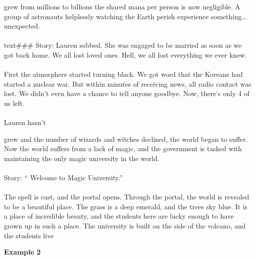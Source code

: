 \begin{tcolorbox}[
    base style,
    colback=boxcolor,
    coltitle=white,
    colbacktitle=headercolor,
    title=Standard Generation
]
{\color{red}grew from millions to billions the shared mana per person is now negligible. A group of astronauts helplessly watching the Earth perish experience something... unexpected.
\\
\\
text{\#\#\#} Story: Lauren sobbed. She was engaged to be married as soon as we got back home. We all lost loved ones. Hell, we all lost everything we ever knew. 
\\
\\
First the atmosphere started turning black. We got word that the Koreans had started a nuclear war. But within minutes of receiving news, all radio contact was lost. We didn't even have a chance to tell anyone goodbye. Now, there's only 4 of us left. 
\\
\\
Lauren hasn't}
\end{tcolorbox}



\vspace{2mm}

\begin{tcolorbox}[
    base style,
    colback=boxcolor,
    coltitle=white,
    colbacktitle=headercolor,
    title=\sys Generation
]
{\color{red}grew} and the number of wizards and witches declined, the world began to suffer. Now the world suffers from a lack of magic, and the government is tasked with maintaining the only magic university in the world.
\\
\\
\text{\#\#\#} Story: `` Welcome to Magic University.'' 
\\
\\
The spell is cast, and the portal opens. Through the portal, the world is revealed to be a beautiful place. The grass is a deep emerald, and the trees sky blue. It is a place of incredible beauty, and the students here are lucky enough to have grown up in such a place. The university is built on the side of the volcano, and the students live
\end{tcolorbox}

\newpage
\textbf{Example 2}


